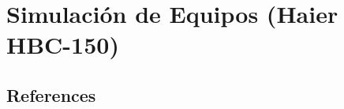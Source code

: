 \documentclass[
  spanish,
  letterpaper,
  DIV=11,
  numbers=noendperiod]{scrreprt}
\begin{document}
\chapter{}\label{section-3}

\part{Simulación de Equipos (Haier HBC-150)}

\chapter{}\label{section-4}

\chapter{}\label{section-5}


\chapter{}\label{section-6}


\chapter*{References}\label{references}


\label{refs}
\end{document}
